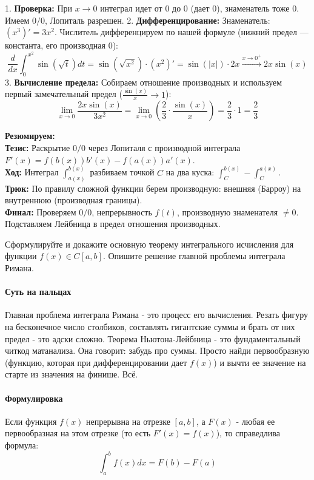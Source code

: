 1. \textbf{Проверка:} При $x \to 0$ интеграл идет от 0 до 0 (дает 0), знаменатель тоже 0. Имеем $0/0$, Лопиталь разрешен.
2. \textbf{Дифференцирование:} Знаменатель: $(x^3)' = 3x^2$. Числитель дифференцируем по нашей формуле (нижний предел — константа, его производная 0):
$$ \frac{d}{dx} \int_0^{x^2} \sin(\sqrt{t}) dt = \sin(\sqrt{x^2}) \cdot (x^2)' = \sin(|x|) \cdot 2x \xrightarrow{x \to 0^+} 2x \sin(x) $$
3. \textbf{Вычисление предела:} Собираем отношение производных и используем первый замечательный предел ($\frac{\sin(x)}{x} \to 1$):
$$ \lim_{x \to 0} \frac{2x \sin(x)}{3x^2} = \lim_{x \to 0} \left( \frac{2}{3} \cdot \frac{\sin(x)}{x} \right) = \frac{2}{3} \cdot 1 = \frac{2}{3} $$
\begin{tcolorbox}[colback=gray!5, colframe=black, boxrule=0.5pt, arc=0pt]
\textbf{Резюмируем:} \\
\textbf{Тезис:} Раскрытие $0/0$ через Лопиталя с производной интеграла $F'(x) = f(b(x))b'(x) - f(a(x))a'(x)$. \\
\textbf{Ход:} Интеграл $\int_{a(x)}^{b(x)}$ разбиваем точкой $C$ на два куска: $\int_C^{b(x)} - \int_C^{a(x)}$. \\
\textbf{Трюк:} По правилу сложной функции берем производную: внешняя (Барроу) на внутреннюю (производная границы). \\
\textbf{Финал:} Проверяем $0/0$, непрерывность $f(t)$, производную знаменателя $\neq 0$. Подставляем Лейбница в предел отношения производных.
\end{tcolorbox}



{Сформулируйте и докажите основную теорему интегрального исчисления для функции $f(x) \in C[a, b]$. Опишите решение главной проблемы интеграла Римана.}

\paragraph{Суть на пальцах}
Главная проблема интеграла Римана - это процесс его вычисления. Резать фигуру на бесконечное число столбиков, составлять гигантские суммы и брать от них предел - это адски сложно. Теорема Ньютона-Лейбница - это фундаментальный читкод матанализа. Она говорит: забудь про суммы. Просто найди первообразную (функцию, которая при дифференцировании дает $f(x)$) и вычти ее значение на старте из значения на финише. Всё.

\paragraph{Формулировка}
Если функция $f(x)$ непрерывна на отрезке $[a, b]$, а $F(x)$ - любая ее первообразная на этом отрезке (то есть $F'(x) = f(x)$), то справедлива формула:
$$ \int_a^b f(x)dx = F(b) - F(a) $$

